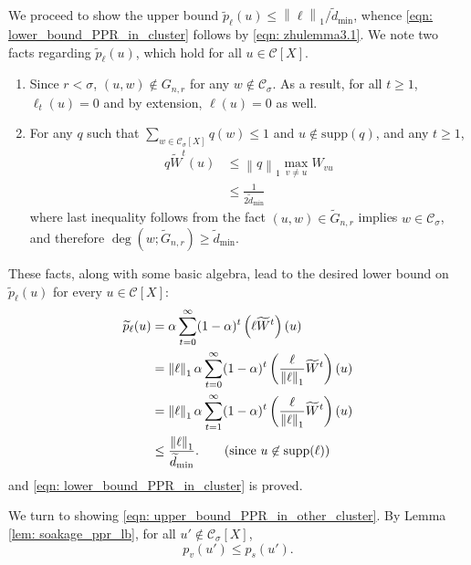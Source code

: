 \documentclass[11pt,twoside]{article}
\newcommand{\norm}[1]{\left\lVert#1\right\rVert}
\newcommand{\1}{\mathbbm{1}}
\newcommand{\pbf}{p}        %
\newcommand{\Xbf}{X}
\newcommand{\Wbf}{W}
\newcommand{\Cset}{\mathcal{C}}
\newcommand{\Csig}{\Cset_{\sigma}}
\newcommand{\degminwt}{\widetilde{d}_{\min}}
\begin{document}
	We proceed to show the upper bound $\widetilde{\pbf}_{\ell}(u) \leq \norm{\ell}_1 / \degminwt$, whence \eqref{eqn: lower_bound_PPR_in_cluster} follows by \eqref{eqn: zhulemma3.1}. We note two facts regarding $\widetilde{\pbf}_{\ell}(u)$, which hold for all $u \in \Cset[\Xbf]$. 
	\begin{enumerate}
		\item Since $r < \sigma$, $(u,w) \not\in G_{n,r}$ for any $w \not\in \Csig$. As a result, for all $t \geq 1$, $\ell_t(u) = 0$ and by extension, $\ell(u) = 0$ as well.
		\item For any $q$ such that $\sum_{w \in \Csig[\Xbf]} q(w) \leq 1$ and $u \not\in \mathrm{supp}(q)$, and any $t \geq 1$,
		\begin{align}
		\label{eqn: one_step_bound}
		q \widetilde{\Wbf}^t (u) & \leq \norm{q}_1 \max_{v \neq u} W_{vu} \nonumber \\
		& \leq \frac{1}{2\degminwt} 
		\end{align}
		where last inequality follows from the fact $(u,w) \in \widetilde{G}_{n,r}$ implies $w \in \Csig$, and therefore $\deg(w; \widetilde{G}_{n,r}) \geq \degminwt$.
	\end{enumerate}
	
	These facts, along with some basic algebra, lead to the desired lower bound on $\widetilde{\pbf}_{\ell}(u)$ for every $u \in \Cset[\Xbf]$:
	\begin{align*}
	\widetilde{\pbf}_{\ell}(u) & = \alpha \sum_{t = 0}^{\infty} (1 - \alpha)^t \left(\ell \widetilde{\Wbf}^t \right)(u)  \nonumber \\
	& = \norm{\ell}_1 \alpha \sum_{t = 0}^{\infty} (1 - \alpha)^t \left(\frac{\ell}{\norm{\ell}_1}  \widetilde{\Wbf}^t \right)(u)\nonumber \\
	& = \norm{\ell}_1 \alpha \sum_{t = 1}^{\infty} (1 - \alpha)^t \left(\frac{\ell}{\norm{\ell}_1}  \widetilde{\Wbf}^t \right)(u)\nonumber \\
	& \leq \frac{\norm{\ell}_1 }{\degminwt}. \tag{since $u \not\in \mathrm{supp}(\ell)$}
	\end{align*}
	and \eqref{eqn: lower_bound_PPR_in_cluster} is proved.
	
	We turn to showing \eqref{eqn: upper_bound_PPR_in_other_cluster}. By Lemma \ref{lem: soakage_ppr_lb}, for all $u' \not\in \Csig[\Xbf]$,
	\begin{equation*}
	\pbf_v(u') \leq \pbf_s(u').
	\end{equation*}
	
\end{document}
